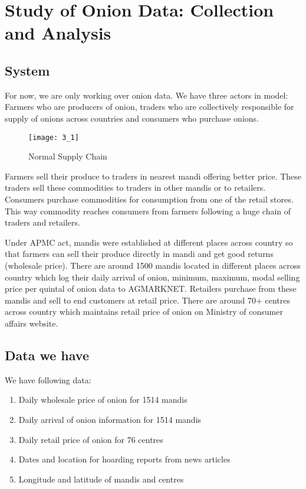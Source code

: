 \chapter{Study of Onion Data: Collection and Analysis}


\section{System}

For now, we are only working over onion data. We have three actors in model: Farmers who are producers of onion, traders who are collectively responsible for supply of onions across countries and consumers who purchase onions.

\begin{figure}[here]
\begin{center}	
\texttt{[image: 3\_1]} 
\caption{Normal Supply Chain}
\label{fig:Normal Supply Chain}
\end{center}
\end{figure}

Farmers sell their produce to traders in nearest mandi offering better price. These traders sell these commodities to traders in other mandis or to retailers. Consumers purchase commodities for consumption from one of the retail stores. This way commodity reaches consumers from farmers following a huge chain of traders and retailers.

Under APMC act, mandis were established at different places across country so that farmers can sell their produce directly in mandi and get good returns (wholesale price). There are around 1500 mandis located in different places across country which log their daily arrival of onion, minimum, maximum, modal selling price per quintal of onion data to AGMARKNET. Retailers purchase from these mandis and sell to end customers at retail price. There are around 70+ centres across country which maintains retail price of onion on Ministry of consumer affairs website.

\section{Data we have}

We have following data:

\begin{enumerate}

\item Daily wholesale price of onion for 1514 mandis 
\item Daily arrival of onion information for 1514 mandis
\item Daily retail price of onion for 76 centres
\item Dates and location for hoarding reports from news articles
\item Longitude and latitude of mandis and centres

\end{enumerate}


